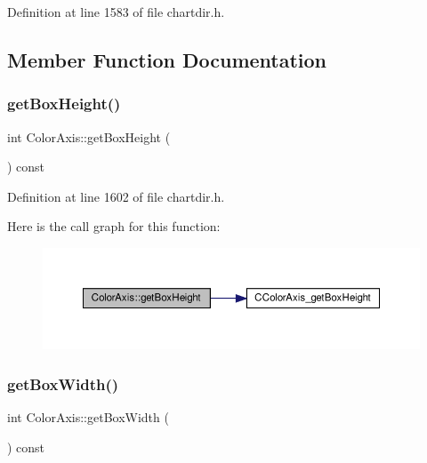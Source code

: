 Definition at line 1583 of file chartdir.\+h.



\subsection{Member Function Documentation}
\mbox{\label{class_color_axis_a247cf31201720a7ef116f86a087ffa93}} 
\subsubsection{\texorpdfstring{get\+Box\+Height()}{getBoxHeight()}}
{\footnotesize\ttfamily int Color\+Axis\+::get\+Box\+Height (\begin{DoxyParamCaption}{ }\end{DoxyParamCaption}) const\hspace{0.3cm}{\ttfamily [inline]}}



Definition at line 1602 of file chartdir.\+h.

Here is the call graph for this function\+:
\nopagebreak
\begin{figure}[H]
\begin{center}
\leavevmode
\includegraphics[width=350pt]{class_color_axis_a247cf31201720a7ef116f86a087ffa93_cgraph}
\end{center}
\end{figure}
\mbox{\label{class_color_axis_a72496a3139183a40c1eb75d77b63a437}} 
\subsubsection{\texorpdfstring{get\+Box\+Width()}{getBoxWidth()}}
{\footnotesize\ttfamily int Color\+Axis\+::get\+Box\+Width (\begin{DoxyParamCaption}{ }\end{DoxyParamCaption}) const\hspace{0.3cm}{\ttfamily [inline]}}



